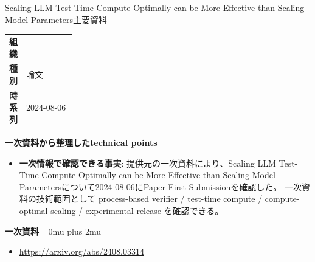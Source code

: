 \begin{technicalnote}{Scaling LLM Test-Time Compute Optimally can be More Effective than Scaling Model Parameters}{主要資料}
\begingroup
\begin{tabularx}{\linewidth}{@{}>{\bfseries}p{0.22\linewidth}X@{}}
組織 & - \\
種別 & 論文 \\
時系列 & 2024-08-06 \\
\end{tabularx}
\smallskip
{\bfseries 一次資料から整理したtechnical points}
\begin{itemize}[leftmargin=1.5em,itemsep=0.35em]
\item \textbf{一次情報で確認できる事実}: 提供元の一次資料により、Scaling LLM Test-Time Compute Optimally can be More Effective than Scaling Model Parametersについて2024-08-06にPaper First Submissionを確認した。 一次資料の技術範囲として process-based verifier / test-time compute / compute-optimal scaling / experimental release を確認できる。
\end{itemize}
\begin{minipage}{\linewidth}
\begin{samepage}
{\bfseries 一次資料}
\begingroup\sloppy
\Urlmuskip=0mu plus 2mu\relax
\begin{itemize}[leftmargin=1.5em,itemsep=0.25em]
\item {\scriptsize\url{https://arxiv.org/abs/2408.03314}}
\end{itemize}
\endgroup
\end{samepage}
\end{minipage}
\endgroup
\end{technicalnote}
\medskip

